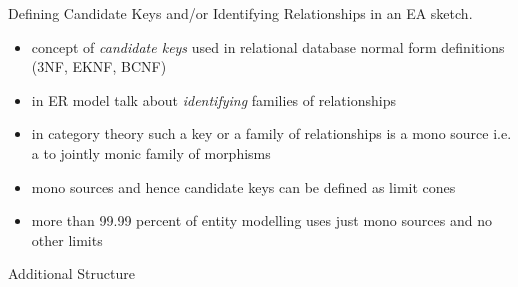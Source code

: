 \iffalse %
\begin{frame}{Normalisation}
\begin{definition}
{ \footnotesize
If $T$ is a theory and $W \subset |Mod(T,FinSet)|$ is an intended usage then an interpretation (theory morphism) $I: T \morph T'$ is an improvement of $T$ wrt $W$ iff 
$Mod(I,Finset): Mod(U',Finset) \morph Mod(U,Finset)$ is injective but not surjective
and $W \subseteq img(Mod(I,Finset))$.
i.e. for all models $U \in W$ there exists $U' \in Mod(T,Finset)$ such that $I \circ U'=U$
$
\begin{array} {c p{2cm} c}
\Rnode{T}{T} && \\ [0.25cm]
             && \Rnode{finset}{Finset} \\ [0.25cm]
\Rnode{Tp}{T'}  
\end{array}
$
\ncarr {T}{finset}
\alabel{U}
\ncarr{T}{Tp}
\blabel{I}
\ncarr{Tp}{finset}
\blabel{U'} 
}
\end{definition}

\begin{definition}
If a theory $T$ has no improvement wrt to an intended usage $W$ then $T$ is said to be \textit{optimally formulated} wrt $W$.
\end{definition}
\end{frame}


\begin{frame}{Propositions}
\begin{itemize}
\item If a relational schema $R$ can be normalised to $R'$ then the associated theory $T$ of $R$ can be improved to the associated thery $T'$ of $R'$.

\item If a relational database schema is in normal form then its associated theory is optimally formulated.
\end{itemize}
\end{frame} 
\fi

\begin{frame}{Defining Candidate Keys and/or Identifying Relationships in an EA sketch.  }
\begin{itemize}
\item concept of \textit{candidate keys} used in relational database normal form definitions {\scriptsize (3NF, EKNF, BCNF)}
\item in ER model talk about \textit{identifying} families of relationships
\item in category theory such a key or a family of relationships is a mono source i.e. a to jointly monic family of morphisms
\item mono sources and hence candidate keys can be defined as limit cones
\item more than 99.99 percent of entity modelling uses just mono sources and no other limits
\end{itemize}
\end{frame}

\begin{frame}{Additional Structure}
\resizebox{11.3cm}{!}{

\featurelist
}
\end{frame}

